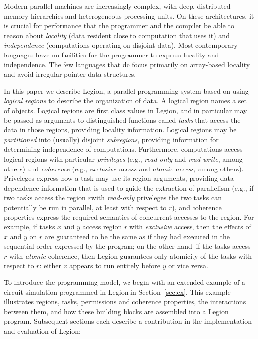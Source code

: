 \documentclass[conference]{IEEEtran}
\begin{document}
Modern parallel machines are increasingly complex, with deep,
distributed memory hierarchies and heterogeneous processing units.  On
these architectures, it is crucial for performance that the programmer
and the compiler be able to reason about {\em locality} (data resident
close to computation that uses it) and {\em independence} (computations
operating on disjoint data).  Most contemporary
languages have no facilities for the programmer to express locality
and independence.  The few languages that do focus primarily on
array-based locality \cite{Fatahalian06,CHAPEL04,UPC99} and 
avoid irregular pointer data structures.

In this paper we describe Legion, a parallel programming system based
on using {\em logical regions} to describe the organization of data.
A logical region names a set of objects.  Logical regions are first
class values in Legion, and in particular may be passed as arguments
to distinguished functions called {\em tasks} that access the data in
those regions, providing locality information.  Logical regions may be
{\em partitioned} into (usually) disjoint {\em subregions}, providing
information for determining independence of computations.
Furthermore, computations access logical regions with particular {\em
  privileges} (e.g., {\em read-only} and {\em read-write}, among
others) and {\em coherence} (e.g., {\em exclusive access} and {\em
  atomic access}, among others).  Priveleges express how a task may
use its region arguments, providing data dependence information that
is used to guide the extraction of parallelism (e.g., if two tasks
access the region $r$with {\em read-only} priveleges the two tasks
can potentially be run in parallel, at least with respect to $r$),
and coherence properties express the required semantics of concurrent
accesses to the region.  For example, if tasks $x$ and $y$ access
region $r$ with {\em exclusive} access, then the effects of $x$ and
$y$ on $r$ are guaranteed to be the same as if they had executed in
the sequential order expressed by the program; on the other hand, if
the tasks access $r$ with {\em atomic} coherence, then Legion
guarantees only atomicity of the tasks with respect to $r$: either $x$
appears to run entirely before $y$ or vice versa.

To introduce the programming model, we begin with an extended example
of a circuit simulation programmed in Legion in
Section~\ref{sec:ex}. This example illustrates regions, tasks,
permissions and coherence properties, the interactions between them,
and how these building blocks are assembled into a Legion
program.  Subsequent sections each describe a contribution in the
implementation and evaluation of Legion:
 
\end{document}

